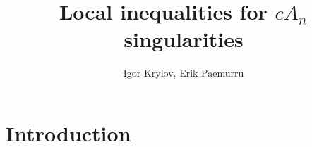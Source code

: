 \documentclass{article}
\title{Local inequalities for $cA_n$ singularities}
\author{Igor Krylov, Erik Paemurru}
\begin{document}
\maketitle

\section{Introduction}
\end{document}

